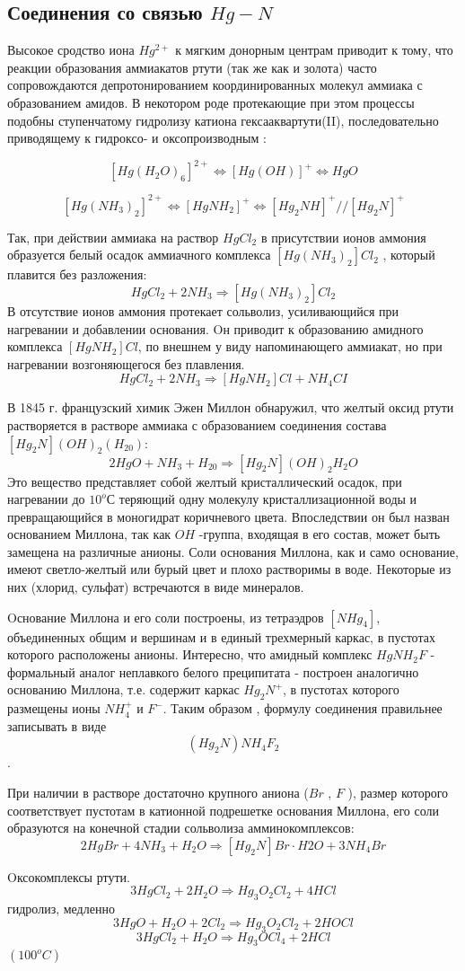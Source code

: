 \documentclass[11pt]{article}
\begin{document}
\subsection{Соединения со связью $Hg-N$}

Высокое сродство иона $Hg^{2+}$ к мягким донорным центрам приводит к тому, что реакции
образования аммиакатов ртути (так же как и золота) часто сопровождаются депротонированием
координированных молекул аммиака с образованием амидов. В некотором роде протекающие при
этом процессы подобны ступенчатому гидролизу катиона гексааквартути(II), последовательно
приводящему к гидроксо- и оксопроизводным :

$$[Hg(H_2O)_6]^{2+} \Leftrightarrow [Hg(OH)]^+ \Leftrightarrow HgO $$

$$[Hg(NH_3)_2]^{2+} \Leftrightarrow [HgNH_2]^+ \Leftrightarrow [Hg_2NH]^+//[Hg_2N]^+$$

Так, при действии аммиака на раствор $HgCl_2$ в присутствии ионов аммония образуется белый осадок
аммиачного комплекса $[Hg(NH_3)_2]Cl_2$ , который плавится без разложения:
$$HgCl_2 + 2NH_3\Rightarrow[Hg(NH_3)_2]Cl_2$$
В отсутствие ионов аммония протекает сольволиз, усиливающийся при нагревании и добавлении
основания. Oн приводит к образованию амидного комплекса $[HgNH_2]Cl$, по внешнем у виду
напоминающего аммиакат, но при нагревании возгоняющегося без плавления.
$$HgCl_2 + 2NH_3 \Rightarrow [HgNH_2]Cl + NH_4CI$$

В 1845 г. французский химик Эжен Миллон обнаружил, что желтый оксид ртути растворяется в
растворе аммиака с образованием соединения состава
$[Hg_2N](OH)_2(H_20)$:
$$2HgO + NH_3 + H_20 \Rightarrow [Hg_2N](OH)_2H_2O$$
Это вещество представляет собой желтый кристаллический осадок, при нагревании до $10 ^oС$
теряющий одну молекулу кристаллизационной воды и превращающийся в моногидрат коричневого
цвета. Впоследствии он был назван основанием Миллона, так как $OH$ -группа, входящая в его
состав, может быть замещена на различные анионы. Соли основания Миллона, как и само
основание, имеют светло-желтый или бурый цвет и плохо растворимы в воде. Hекоторые из них
(хлорид, сульфат) встречаются в виде минералов.

Oснование Миллона и его соли построены, из тетраэдров $[NHg_4]$, объединенных общим и вершинам
и в единый трехмерный каркас, в пустотах которого расположены анионы. Интересно, что амидный
комплекс $HgNH_2F$ - формальный аналог неплавкого белого преципитата - построен аналогично
основанию Миллона, т.е. содержит каркас $Hg_2N^+$, в пустотах которого размещены ионы $NH_4^+$ и $F^-$.
Таким образом , формулу соединения правильнее записывать в виде $$(Hg_2N)NH_4F_2$$.

При наличии в растворе достаточно крупного аниона ($Br$ , $F$ ), размер которого соответствует
пустотам в катионной подрешетке основания Миллона, его соли образуются на конечной стадии
сольволиза амминокомплексов:
$$2HgBr + 4NH_3 + H_2O \Rightarrow [Hg_2N]Br \cdot H2O + 3NH_4Br$$

Oксокомплексы ртути.
$$3HgCl _2 + 2H _2 O \Rightarrow Hg _3 O _2 Cl _2 + 4HCl$$ гидролиз, медленно
$$3HgO + H_2O + 2Cl_2 \Rightarrow Hg_3O_2Cl_2 + 2HOCl$$
$$3HgCl_2 + H_2O \Rightarrow Hg_3OCl_4 + 2HCl$$ $(100 ^o C)$
\end{document}
